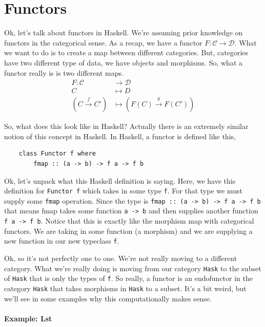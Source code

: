 \chapter{Functors}

Ok, let's talk about functors in Haskell. We're assuming prior knowledge on functors in the categorical sense. As a recap, we have a functor $F: \mathcal{C} \rightarrow \mathcal{D}$. What we want to do is to create a map between different categories. But, categories have two different type of data, we have objects and morphisms. So, what a functor really is is two different maps.
\begin{align*}
    F: \mathcal{C} &\rightarrow \mathcal{D} \\
    C &\mapsto D \\
    (C \xrightarrow[]{f} C') &\mapsto (F(C) \xrightarrow[]{g} F(C'))
\end{align*}

So, what does this look like in Haskell? Actually there is an extremely similar notion of this concept in Haskell. In Haskell, a functor is defined like this,
\begin{lstlisting}
    class Functor f where
        fmap :: (a -> b) -> f a -> f b
\end{lstlisting}

Ok, let's unpack what this Haskell definition is saying. Here, we have this definition for \lstinline{Functor f} which takes in some type \lstinline{f}. For that type we must supply some \lstinline{fmap} operation. Since the type is \lstinline{fmap :: (a -> b) -> f a -> f b} that means fmap takes some function \lstinline{a -> b} and then supplies another function \lstinline{f a -> f b}. Notice that this is exactly like the morphism map with categorical functors. We are taking in some function (a morphism) and we are supplying a new function in our new typeclass \lstinline{f}. 

Ok, so it's not perfectly one to one. We're not really moving to a different category. What we're really doing is moving from our category \lstinline{Hask} to the subset of \lstinline{Hask} that is only the types of \lstinline{f}. So really, a functor is an endofunctor in the category \lstinline{Hask} that takes morphisms in \lstinline{Hask} to a subset. It's a bit weird, but we'll see in some examples why this computationally makes sense. 

\subsubsection{Example: Lst}

